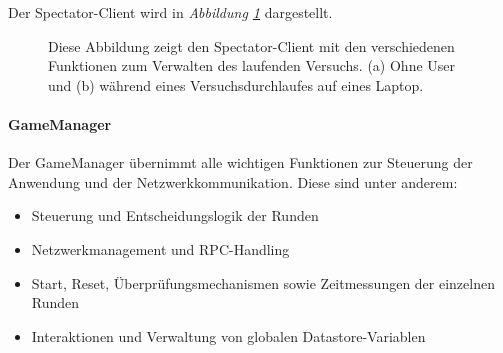 \documentclass[a4paper,11pt]{article}%
\renewcommand{\\}{\vspace*{0.5\baselineskip} \newline}
\begin{document}
Der Spectator-Client wird in \textit{Abbildung \ref{SpectatorView}} dargestellt.

%
\begin{figure}[H]
  \centering
  \qquad
  \caption[Der Spectatorview]{Diese Abbildung zeigt den Spectator-Client mit den verschiedenen Funktionen zum Verwalten des laufenden Versuchs. (a) Ohne User und (b) während eines Versuchsdurchlaufes auf eines Laptop.}
  \label{SpectatorView}
\end{figure}

\paragraph{GameManager}
Der GameManager übernimmt alle wichtigen Funktionen zur Steuerung der Anwendung und der Netzwerkkommunikation.
Diese sind unter anderem:
\begin{itemize}[itemsep=0cm]
\item Steuerung und Entscheidungslogik der Runden
\item Netzwerkmanagement und RPC-Handling
\item Start, Reset, Überprüfungsmechanismen sowie Zeitmessungen der einzelnen Runden
\item Interaktionen und Verwaltung von globalen Datastore-Variablen
\end{itemize}
\end{document}
